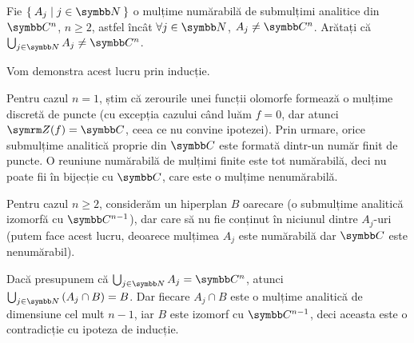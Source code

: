 \setcounter{problem}{3}

\begin{problem}
Fie \(\Set{ A_j | j \in \naturals }\) o mulțime numărabilă de submulțimi analitice din \(\complex^n\), \(n \geq 2\), astfel încât \(\forall j \in \naturals\), \(A_j \neq \complex^n\). Arătați că \(\bigcup_{j \in \naturals} A_j \neq \complex^n\).
\end{problem}
\begin{solution}
Vom demonstra acest lucru prin inducție.

Pentru cazul \(n = 1\), știm că zerourile unei funcții olomorfe formează o mulțime discretă de puncte (cu excepția cazului când luăm \(f = 0\), dar atunci \(\zeros(f) = \complex\), ceea ce nu convine ipotezei). Prin urmare, orice submulțime analitică proprie din \(\complex\) este formată dintr-un număr finit de puncte. O reuniune numărabilă de mulțimi finite este tot numărabilă, deci nu poate fii în bijecție cu \(\complex\), care este o mulțime nenumărabilă.

Pentru cazul \(n \geq 2\), considerăm un hiperplan \(B\) oarecare (o submulțime analitică izomorfă cu \(\complex^{n - 1}\)), dar care să nu fie conținut în niciunul dintre \(A_j\)-uri (putem face acest lucru, deoarece mulțimea \(A_j\) este numărabilă dar \(\complex\) este nenumărabil).

Dacă presupunem că \(\bigcup_{j \in \naturals} A_j = \complex^n\), atunci \(\bigcup_{j \in \naturals} \left(A_j \cap B\right) = B\). Dar fiecare \(A_j \cap B\) este o mulțime analitică de dimensiune cel mult \(n - 1\), iar \(B\) este izomorf cu \(\complex^{n - 1}\), deci aceasta este o contradicție cu ipoteza de inducție.
\end{solution}

\begin{comment}
\begin{problem}
Dați exemplu de o submulțime analitică \(A\) din \(\complex \times \complex^*\) (în particular, \(A\) este închisă în \(\complex \times \complex^*\)) astfel încât închiderea lui \(A\) în \(\complex^2\) nu este submulțime analitică în \(\complex^2\).
\end{problem}
\end{comment}

\setcounter{problem}{5}

